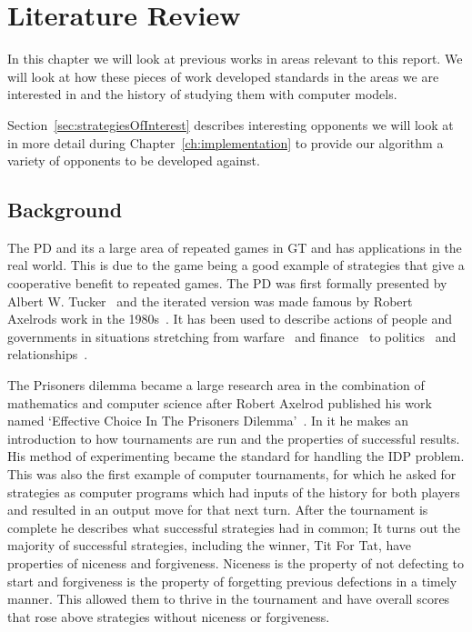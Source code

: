 
\chapter{Literature Review}\label{ch:literature}
In this chapter we will look at previous works in areas relevant to this report.
We will look at how these pieces of work developed standards in the areas we are interested in and the history of studying them with computer models. 

Section~\ref{sec:strategiesOfInterest} describes interesting opponents we will look at in more detail during Chapter~\ref{ch:implementation} to provide our algorithm a variety of opponents to be developed against.

\section{Background}\label{sec:background}
The PD and its a large area of repeated games in GT and has applications in the real world.
This is due to the game being a good example of strategies that give a cooperative benefit to repeated games.
The PD was first formally presented by Albert W. Tucker~\cite{cambell2016thesis, gass2005annotated} and the iterated version was made famous by Robert Axelrods work in the 1980s~\cite{axelrod1980effective}.
It has been used to describe actions of people and governments in situations stretching from warfare~\cite{tooby1988war,aumann1992handbook} and finance~\cite{cable1997finance} to politics~\cite{snidal1985Politics} and relationships~\cite{low2015sex}.

The Prisoners dilemma became a large research area in the combination of mathematics and computer science after Robert Axelrod published his work named `Effective Choice In The Prisoners Dilemma'~\cite{axelrod1980effective}.
In it he makes an introduction to how tournaments are run and the properties of successful results.
His method of experimenting became the standard for handling the IDP problem.
This was also the first example of computer tournaments, for which he asked for strategies as computer programs which had inputs of the history for both players and resulted in an output move for that next turn.
After the tournament is complete he describes what successful strategies had in common; 
It turns out the majority of successful strategies, including the winner, Tit For Tat, have properties of niceness and forgiveness.
Niceness is the property of not defecting to start and forgiveness is the property of forgetting previous defections in a timely manner.
This allowed them to thrive in the tournament and have overall scores that rose above strategies without niceness or forgiveness.

